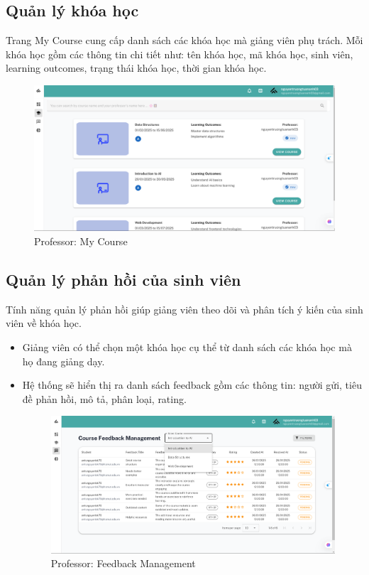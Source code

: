 \subsection{Quản lý khóa học}
Trang My Course cung cấp danh sách các khóa học mà giảng viên phụ trách. Mỗi khóa học gồm các thông tin chi tiết như: tên khóa học, mã khóa học, sinh viên, learning outcomes, trạng thái khóa học, thời gian khóa học.
\begin{figure}[H]
        \centering
        \includegraphics[width=0.8\linewidth]{images/course_professor.png}
        \caption{Professor: My Course}
        \label{fig:course_professor}
    \end{figure}
\subsection{Quản lý phản hồi của sinh viên}
Tính năng quản lý phản hồi giúp giảng viên theo dõi và phân tích ý kiến của sinh viên về khóa học.
\begin{itemize}
    \item Giảng viên có thể chọn một khóa học cụ thể từ danh sách các khóa học mà họ đang giảng dạy.
    \item Hệ thống sẽ hiển thị ra danh sách feedback gồm các thông tin: người gửi, tiêu đề phản hồi, mô tả, phân loại, rating.
    \begin{figure}[H]
        \centering
        \includegraphics[width=0.8\linewidth]{images/feedback_professor.png}
        \caption{Professor: Feedback Management}
        \label{fig:feedback_professor}
    \end{figure}
\end{itemize}
